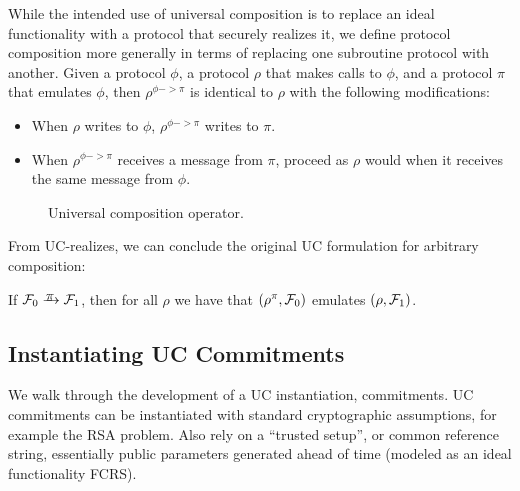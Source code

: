   While the intended use of universal composition is to replace an
ideal functionality with a protocol that securely realizes it, we define
protocol composition  more generally in terms of
replacing one subroutine protocol with another. Given a protocol $\phi$, a protocol
$\rho$ that makes calls to $\phi$,  and a protocol $\pi$ that emulates $\phi$, then $\rho^{\phi -> \pi}$ is identical to
$\rho$ with the following modifications:
\begin{itemize}[leftmargin=*]
  \item When $\rho$ writes to $\phi$, $\rho^{\phi -> \pi}$ writes to $\pi$.
  \item When $\rho^{\phi -> \pi}$ receives a message from $\pi$, proceed as $\rho$ would when
    it receives the same message from $\phi$.
\end{itemize}

\begin{figure}

\caption{Universal composition operator.}
\label{fig:composition-operator}
\end{figure}

From UC-realizes, we can conclude the original UC formulation for arbitrary
composition:
\begin{theorem}
  If $\mc{F}_0 \yrightarrow{$\pi$} \mc{F}_1$, then for all $\rho$ we
  have that $(\rho^{\pi}, \mathcal{{F}}_0)$ emulates $(\rho, \mathcal{{F}}_1)$.
\end{theorem}

\subsection{Instantiating UC Commitments}
\label{subsec:example}
We walk through the development of a UC instantiation, commitments.
UC commitments can be instantiated with standard cryptographic assumptions, for example the RSA problem.
Also rely on a ``trusted setup'', or common reference string, essentially public parameters generated ahead of time (modeled as an ideal functionality FCRS).

